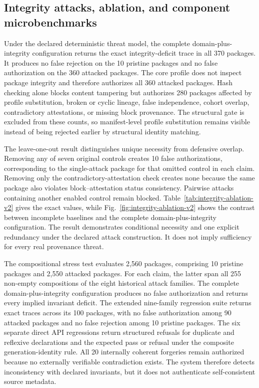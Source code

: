 \subsection{Integrity attacks, ablation, and component microbenchmarks}
\label{subsec:integrity-results}

Under the declared deterministic threat model, the complete domain-plus-integrity configuration returns the exact integrity-deficit trace in all 370 packages. It produces no false rejection on the 10 pristine packages and no false authorization on the 360 attacked packages. The core profile does not inspect package integrity and therefore authorizes all 360 attacked packages. Hash checking alone blocks content tampering but authorizes 280 packages affected by profile substitution, broken or cyclic lineage, false independence, cohort overlap, contradictory attestations, or missing block provenance. The structural gate is excluded from these counts, so manifest-level profile substitution remains visible instead of being rejected earlier by structural identity matching.



The leave-one-out result distinguishes unique necessity from defensive overlap. Removing any of seven original controls creates 10 false authorizations, corresponding to the single-attack package for that omitted control in each claim. Removing only the contradictory-attestation check creates none because the same package also violates block--attestation status consistency. Pairwise attacks containing another enabled control remain blocked. Table~\ref{tab:integrity-ablation-v2} gives the exact values, while Fig.~\ref{fig:integrity-ablation-v2} shows the contrast between incomplete baselines and the complete domain-plus-integrity configuration. The result demonstrates conditional necessity and one explicit redundancy under the declared attack construction. It does not imply sufficiency for every real provenance threat.



The compositional stress test evaluates 2,560 packages, comprising 10 pristine packages and 2,550 attacked packages. For each claim, the latter span all 255 non-empty compositions of the eight historical attack families. The complete domain-plus-integrity configuration produces no false authorization and returns every implied invariant deficit. The extended nine-family regression suite returns exact traces across its 100 packages, with no false authorization among 90 attacked packages and no false rejection among 10 pristine packages. The six separate direct API regressions return structured refusals for duplicate and reflexive declarations and the expected pass or refusal under the composite generation-identity rule. All 20 internally coherent forgeries remain authorized because no externally verifiable contradiction exists. The system therefore detects inconsistency with declared invariants, but it does not authenticate self-consistent source metadata.

